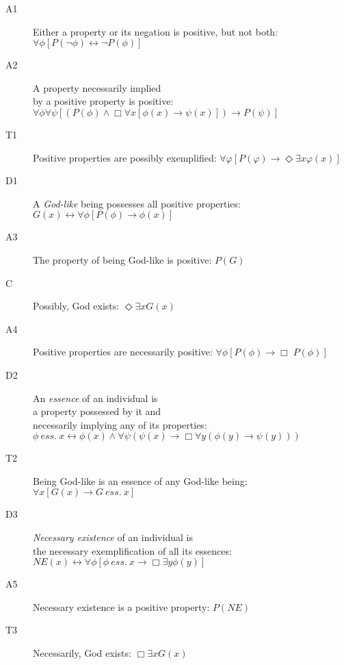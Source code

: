 \documentclass{llncs}
\newcommand{\imp}{\rightarrow}
\newcommand{\biimp}{\leftrightarrow}
\newcommand{\all}{\forall}
\newcommand{\ex}{\exists}
\newcommand{\nec}{\Box} %
\newcommand{\pos}{\Diamond} %
\newcommand{\ess}[2]{#1 \ \mathit{ess.} \ #2}
\newcommand{\NE}{\mathit{NE}}
\begin{document}
\allowdisplaybreaks[1] 
\begin{description}
\item[A1] Either a property or its negation is positive, but not
  both:  \hfill 
  $\all \phi [P(\neg \phi) \biimp \neg P(\phi)]$
\item[A2] A property necessarily implied \\ by a
  positive property is positive: \phantom{b} \hfill 
  $\all \phi \all \psi [(P(\phi) \wedge \nec \all x [\phi(x)
  \imp \psi(x)]) \imp P(\psi)]$ 
\item[T1] Positive properties are possibly exemplified: \hfill $\all \varphi [P(\varphi) \imp \pos \ex x \varphi(x)]$
\item[D1] A \emph{God-like} being possesses all positive properties: \hfill
  $G(x) \biimp \forall \phi [P(\phi) \to \phi(x)]$
\item[A3]  The property of being God-like is positive: \hfill   $P(G)$
\item[C\phantom{1}] Possibly, God exists: \hfill $\pos \ex x G(x)$
\item[A4]  Positive properties are necessarily positive: \hfill 
  $\all \phi [P(\phi) \to \Box \; P(\phi)]$
\item[D2] An \emph{essence} of an individual is  \\ a property possessed by it and \\ necessarily implying any of its properties:
  \phantom{b} \hfill $\ess{\phi}{x} \biimp \phi(x) \wedge \all
  \psi (\psi(x) \imp \nec \all y (\phi(y) \imp \psi(y)))$
\item[T2]  Being God-like is an essence of any
  God-like being: \hfill $\all x [G(x) \imp \ess{G}{x}]$ 
\item[D3] \emph{Necessary existence} of an individual is \\ the necessary exemplification of all its essences: 
  \phantom{b} \hfill $\NE(x) \biimp \all \phi [\ess{\phi}{x} \imp \nec \ex y \phi(y)]$
\item[A5] Necessary existence is a positive property: \hfill $P(\NE)$
\item[T3] Necessarily, God exists: \hfill $\nec \ex x G(x)$ 
\end{description}
\end{document}
